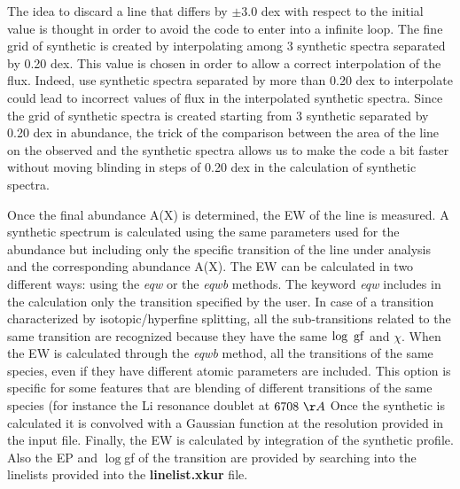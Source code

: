 \documentclass[modern]{aastex701}
\begin{document}
The idea to discard a line that differs by $\pm3.0$ dex with respect to the initial value is thought in order to avoid the code to enter into a infinite loop. The fine grid of synthetic is created by interpolating among 3 synthetic spectra separated by 0.20 dex. This value is chosen in order to allow a correct interpolation of the flux. Indeed, use synthetic spectra separated by more than 0.20 dex to interpolate could lead to incorrect  values of flux in the interpolated synthetic spectra.  Since the grid of synthetic spectra is created starting from 3 synthetic separated by 0.20 dex in abundance, the trick of the comparison between the area of the line on the observed and the synthetic spectra allows us to make the code a bit faster without moving blinding in steps of 0.20 dex in the calculation of synthetic spectra. 

Once the final abundance A(X) is determined, the EW of the line is measured. 
A synthetic spectrum is calculated using the same parameters used for the abundance but including only the specific transition of the line under analysis and the corresponding abundance A(X).  The EW can be calculated in two different ways: using the {\it eqw} or the {\it eqwb} methods. 
The keyword {\it eqw} includes in the calculation only the transition specified by the user. In case of a transition characterized by isotopic/hyperfine splitting, all the sub-transitions related to the same transition are recognized because they have the same $\rm \log~gf$ and $\chi$. 
When the EW is calculated through the {\it eqwb} method, all the transitions of the same species, even if they have different atomic parameters are included. This option is specific for some features that are blending of different transitions of the same species (for instance the
Li resonance doublet at $6708~\AA$
Once the synthetic is calculated it is convolved with a Gaussian function at the resolution provided in the input file. Finally, the EW is calculated by integration of the synthetic profile. Also the EP and $\log$gf of the transition are provided by searching into the linelists provided into the {\bf linelist.xkur} file. 
\end{document}
